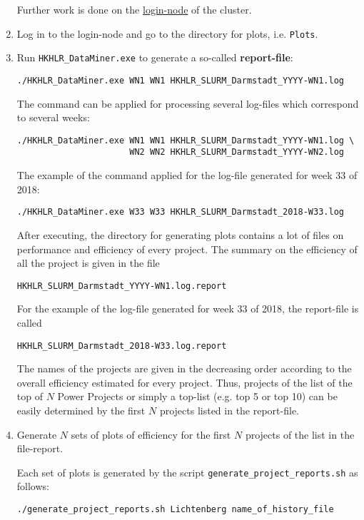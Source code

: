 \documentclass[12pt,a4paper,onecolumn]{article}
\begin{document}
\begin{enumerate}
Further work is done on the \underline{login-node} of the cluster.

\item Log in to the login-node and go to the directory for plots, i.e. \lstinline{Plots}.

\item Run \lstinline{HKHLR_DataMiner.exe} to generate a so-called \textbf{report-file}:
\begin{lstlisting}
./HKHLR_DataMiner.exe WN1 WN1 HKHLR_SLURM_Darmstadt_YYYY-WN1.log
\end{lstlisting}

The command can be applied for processing several log-files which correspond to several weeks:
\begin{lstlisting}
./HKHLR_DataMiner.exe WN1 WN1 HKHLR_SLURM_Darmstadt_YYYY-WN1.log \
                      WN2 WN2 HKHLR_SLURM_Darmstadt_YYYY-WN2.log
\end{lstlisting}

The example of the command applied for the log-file generated for week 33 of 2018:
\begin{lstlisting}
./HKHLR_DataMiner.exe W33 W33 HKHLR_SLURM_Darmstadt_2018-W33.log
\end{lstlisting}

After executing, the directory for generating plots contains a lot of files on performance and efficiency of every project.
The summary on the efficiency of all the project is given in the file
\begin{lstlisting}
HKHLR_SLURM_Darmstadt_YYYY-WN1.log.report
\end{lstlisting}

For the example of the log-file generated for week 33 of 2018, the report-file is called
\begin{lstlisting}
HKHLR_SLURM_Darmstadt_2018-W33.log.report
\end{lstlisting}
The names of the projects are given in the decreasing order according to the overall efficiency estimated for every project.
Thus, projects of the list of the top of $N$ Power Projects or simply a top-list (e.g. top 5 or top 10) can be easily determined by the first $N$ projects listed in the report-file.

\item Generate $N$ sets of plots of efficiency for the first $N$ projects of the list in the file-report.

Each set of plots is generated by the script \lstinline{generate_project_reports.sh} as follows:
\begin{lstlisting}
./generate_project_reports.sh Lichtenberg name_of_history_file
\end{lstlisting}
\vspace{\baselineskip}


\end{enumerate}
\end{document}
